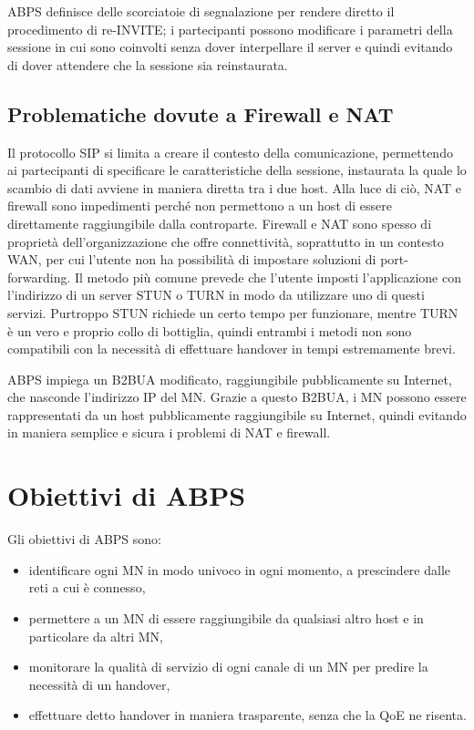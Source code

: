 \documentclass[12pt,a4paper,openright,twoside]{book}
\begin{document}
ABPS definisce delle scorciatoie di segnalazione per rendere diretto il
procedimento di re-INVITE; i partecipanti possono modificare i
parametri della sessione in cui sono coinvolti senza dover
interpellare il server e quindi evitando di dover attendere che la
sessione sia reinstaurata.

\subsection{Problematiche dovute a Firewall e NAT}

Il protocollo SIP si limita a creare il contesto della comunicazione,
permettendo ai partecipanti di specificare le caratteristiche della
sessione, instaurata la quale lo scambio di dati avviene in maniera
diretta tra i due host. Alla luce di ciò, NAT e firewall sono
impedimenti perché non permettono a un host di essere direttamente
raggiungibile dalla controparte. Firewall e NAT sono spesso di
proprietà dell'organizzazione che offre connettività, soprattutto in
un contesto WAN, per cui l'utente non ha possibilità di impostare
soluzioni di port-forwarding. Il metodo più comune prevede che
l'utente imposti l'applicazione con l'indirizzo di un server STUN o
TURN in modo da utilizzare uno di questi servizi. Purtroppo STUN
richiede un certo tempo per funzionare, mentre TURN è un vero e
proprio collo di bottiglia, quindi entrambi i metodi non sono
compatibili con la necessità di effettuare handover in tempi
estremamente brevi.

ABPS impiega un B2BUA modificato, raggiungibile pubblicamente su
Internet, che nasconde l'indirizzo IP del MN. Grazie a questo B2BUA, i
MN possono essere rappresentati da un host pubblicamente raggiungibile
su Internet, quindi evitando in maniera semplice e sicura i problemi
di NAT e firewall.

\section {Obiettivi di ABPS}

Gli obiettivi di ABPS sono:

\begin{itemize}
\item identificare ogni MN in modo univoco in ogni momento, a
  prescindere dalle reti a cui è connesso,
\item permettere a un MN di essere raggiungibile da qualsiasi altro
  host e in particolare da altri MN,
\item monitorare la qualità di servizio di ogni canale di un MN per
  predire la necessità di un handover,
\item effettuare detto handover in maniera trasparente, senza che la
  QoE ne risenta.
\end{itemize}
\end{document}
